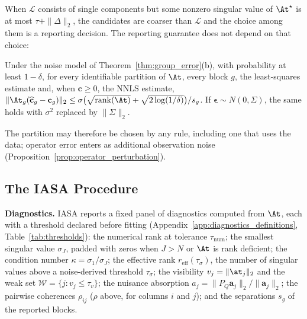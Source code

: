 When \(\mathcal L\) consists of single components but some nonzero singular value of \(\At^\star\) is at most \(\tau+\|\Delta\|_2\), the candidates are coarser than \(\mathcal L\) and the choice among them is a reporting decision.  The reporting guarantee does not depend on
that choice:

\begin{corollary}
\label{cor:uniform_bound}
Under the noise model of Theorem~\ref{thm:group_error}(b), with probability at least
\(1-\delta\), for every identifiable partition of \(\At\), every block \(g\), the
least-squares estimate and, when \(\mathbf c\ge0\), the NNLS estimate,
\(\|\At_g(\widehat{\mathbf c}_g-\mathbf c_g)\|_2\le
\sigma\bigl(\sqrt{\operatorname{rank}(\At)}+\sqrt{2\log(1/\delta)}\bigr)/s_g\).  If
\(\boldsymbol\epsilon\sim N(0,\Sigma)\), the same holds with \(\sigma^2\) replaced by
\(\|\Sigma\|_2\).
\end{corollary}

The partition may therefore be chosen by any rule, including one that uses the data;
operator error enters as additional observation noise
(Proposition~\ref{prop:operator_perturbation}).

\subsection{The IASA Procedure}
\label{sec:identifiability_aware_method}

\noindent\textbf{Diagnostics.}
IASA reports a fixed panel of diagnostics computed from \(\At\), each with a
threshold declared before fitting (Appendix~\ref{app:diagnostics_definitions},
Table~\ref{tab:thresholds}): the numerical rank at tolerance \(\tau_{\mathrm{num}}\);
the smallest singular value \(\sigma_J\), padded with zeros when \(J>N\) or \(\At\) is
rank deficient; the condition number \(\kappa=\sigma_1/\sigma_J\); the effective rank
\(r_{\mathrm{eff}}(\tau_\sigma)\), the number of singular values above a noise-derived
threshold \(\tau_\sigma\); the visibility \(v_j=\|\at_j\|_2\) and the weak set
\(\mathcal W=\{j:v_j\le\tau_v\}\); the nuisance absorption
\(a_j=\|P_Q\mathbf a_j\|_2/\|\mathbf a_j\|_2\); the pairwise coherences \(\rho_{ij}\) (\(\rho\) above, for columns \(i\) and \(j\));
and the separations \(s_g\) of the reported blocks.

